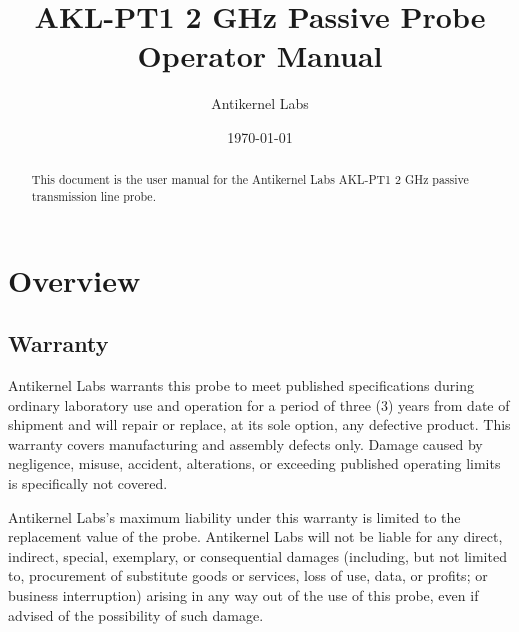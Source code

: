 \documentclass[11pt]{article}
\begin{document}
\title{AKL-PT1 2 GHz Passive Probe Operator Manual}
\author{Antikernel Labs\\
}
\date{\today}

\maketitle
\begin{abstract} \normalsize
This document is the user manual for the Antikernel Labs AKL-PT1 2 GHz passive transmission line probe.
\end{abstract}
\thispagestyle{empty}

\pagebreak

\tableofcontents

\pagebreak

\section{Overview}



\subsection{Warranty}

Antikernel Labs warrants this probe to meet published specifications during ordinary laboratory use and operation for a
period of three (3) years from date of shipment and will repair or replace, at its sole option, any defective product.
This warranty covers manufacturing and assembly defects only. Damage caused by negligence, misuse, accident,
alterations, or exceeding published operating limits is specifically not covered.

Antikernel Labs's maximum liability under this warranty is limited to the replacement value of the probe. Antikernel
Labs will not be liable for any direct, indirect, special, exemplary, or consequential damages (including, but not
limited to, procurement of substitute goods or services, loss of use, data, or profits; or business interruption)
arising in any way out of the use of this probe, even if advised of the possibility of such damage.
\end{document}
